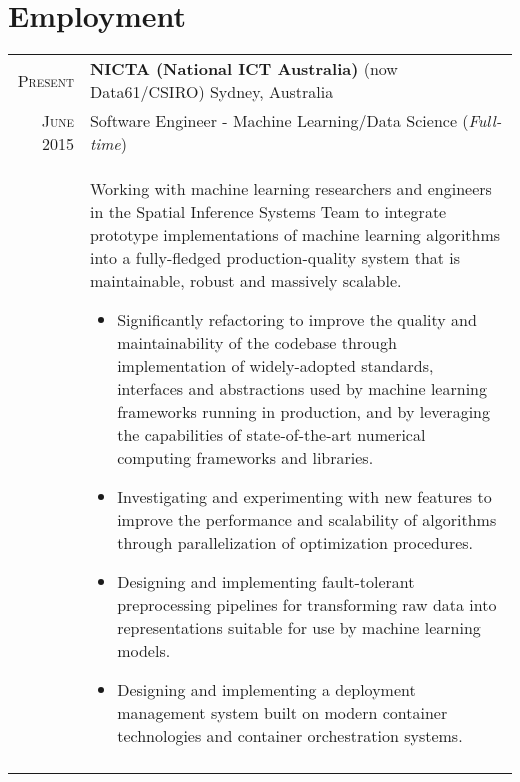 \documentclass[a4paper,10pt]{article} %
\begin{document}

\section{Employment}

\begin{longtable}{r|p{13.8cm}}
  \textsc{Present}   & \textbf{NICTA (National ICT Australia)} (now Data61/CSIRO) 
                       \hfill Sydney, Australia \\
  \textsc{June 2015} & Software Engineer - Machine Learning/Data Science
                       \hfill (\emph{Full-time}) \\
  & {\scriptsize
      Working with machine learning researchers and engineers in the Spatial 
      Inference Systems Team to integrate prototype implementations of machine 
      learning algorithms into a fully-fledged production-quality system that is
      maintainable, robust and massively scalable.
      \begin{itemize}
        \item Significantly refactoring to improve the quality and 
              maintainability of the codebase through implementation of 
              widely-adopted standards, interfaces and abstractions used by 
              machine learning frameworks running in production, and by 
              leveraging the capabilities of state-of-the-art numerical 
              computing frameworks and libraries.
        \item Investigating and experimenting with new features to improve the 
              performance and scalability of algorithms through parallelization
              of optimization procedures.
        \item Designing and implementing fault-tolerant preprocessing pipelines
              for transforming raw data into representations suitable for use by 
              machine learning models.
        \item Designing and implementing a deployment management system built on
              modern container technologies and container orchestration systems.
      \end{itemize}
    } \\
        
  \multicolumn{2}{c}{} \\


\end{longtable}
\end{document}

